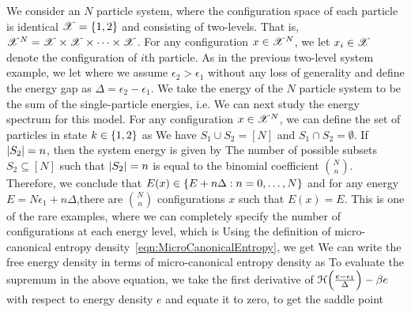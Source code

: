 \documentclass[letterpaper,english,10pt]{article}
\begin{document}
\begin{shaded*} 
\begin{exmp}
We consider an $N$ particle system, 
where the configuration space of each particle is identical $\mathscr{X} = \left\{1,2\right\}$ and consisting of two-levels. 
That is, $\mathscr{X}^N = \mathscr{X} \times \mathscr{X}  \times \dots \times \mathscr{X}$. 
For any configuration $x \in \mathscr{X}^N$, we let $x_i \in \mathscr{X}$ denote the configuration of $i$th particle. 
As in the previous two-level system example, we let 
where we assume $\epsilon_2 > \epsilon_1$ without any loss of generality and define the energy gap as $\Delta = \epsilon_2 - \epsilon_1$. 
We take the energy of the $N$ particle system to be the sum of the single-particle energies, i.e. 
We can next study the energy spectrum for this model. 
For any configuration $x \in \mathscr{X}^N$, we can define the set of particles in state $k \in \left\{1,2\right\}$ as 
We have $S_1 \cup S_2 = [N]$ and $S_1 \cap S_2 = \emptyset$. 
If $\left\lvert S_2\right\rvert = n$, then the system energy is given by 
The number of possible subsets $S_2 \subseteq [N]$ such that $\left\lvert S_2\right\rvert = n$ is equal to the binomial coefficient $\binom{N}{n}$. 
Therefore, we conclude that $E(x) \in \left\{E+n\Delta: n = 0, \dots, N\right\}$ and for any energy $E = N \epsilon_1 + n\Delta$,there are $\binom{N}{n}$ configurations $x$ such that $E(x) = E$. 
This is one of the rare examples, where we can completely specify the number of configurations at each energy level, which is 
Using the definition of micro-canonical entropy density~\eqref{eqn:MicroCanonicalEntropy}, we get
We can write the free energy density in terms of micro-canonical entropy density as 
To evaluate the supremum in the above equation, 
we take the first derivative of $\mathcal{H}\Big(\frac{e-\epsilon_1}{\Delta}\Big)  -\beta e$ with respect to energy density $e$ and equate it to zero, to get the saddle point

\end{exmp}
\end{shaded*}
\end{document}
